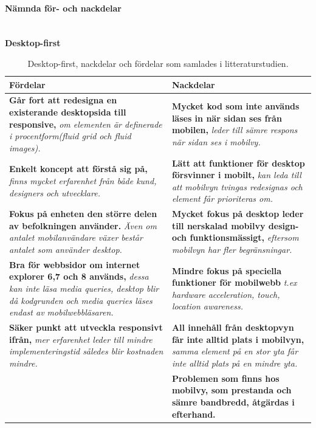 \documentclass[11pt]{article}
\begin{document}
\paragraph{Nämnda för- och nackdelar}\mbox{} \\

\textbf{Desktop-first}
\begin{table}[H]
\centering
\begin{tabular}{|p{7.2cm}|p{7.2cm}|}
\hline
Fördelar&Nackdelar\\ \hline
\textbf{Går fort att redesigna en existerande desktopsida till responsive, }\textit{om elementen är definerade i procentform(fluid grid och fluid images).}&\textbf{Mycket kod som inte används läses in när sidan ses från mobilen, }\textit{leder till sämre respons när sidan ses i mobilvy.}\\ \hline
\textbf{Enkelt koncept att förstå sig på, }\textit{finns mycket erfarenhet från både kund, designers och utvecklare.}& \textbf{Lätt att funktioner för desktop försvinner i mobilt,} \textit{kan leda till att mobilvyn tvingas redesignas och element får prioriteras om.} \\ \hline
\textbf{Fokus på enheten den större delen av befolkningen använder. }\textit{Även om antalet mobilanvändare växer består antalet som använder desktop.}&\textbf{Mycket fokus på desktop leder till nerskalad mobilvy design- och funktionsmässigt, }\textit{eftersom mobilvyn har fler begränsningar.}\\ \hline
\textbf{Bra för webbsidor om internet explorer 6,7 och 8 används, }\textit{dessa kan inte läsa media queries, desktop blir då kodgrunden och media queries läses endast av mobilwebbläsaren.}&  \textbf{Mindre fokus  på speciella funktioner för mobilwebb} \textit{t.ex hardware acceleration, touch, location awareness.} \\ \hline
\textbf{Säker punkt att utveckla responsivt ifrån, }\textit{mer erfarenhet leder till mindre implementeringstid således blir kostnaden mindre.}&\textbf{All innehåll från desktopvyn får inte alltid plats i mobilvyn,} \textit{samma element på en stor yta får inte alltid plats på en mindre yta.}\\ \hline
~&\textbf{Problemen som finns hos mobilvy, som prestanda och sämre bandbredd, åtgärdas i efterhand.}\\ \hline


    \end{tabular}
    \caption {Desktop-first, nackdelar och fördelar som samlades i litteraturstudien.}
\end{table}
\newpage
\end{document}
